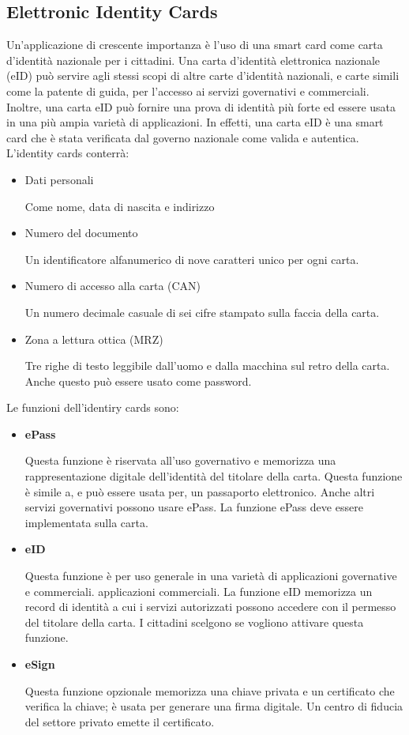 \subsection{Elettronic Identity Cards}
Un'applicazione di crescente importanza è l'uso di una smart card come carta d'identità nazionale per i cittadini. Una carta d'identità elettronica nazionale (eID) può servire agli stessi scopi di altre carte d'identità nazionali, e carte simili come la patente di guida, per l'accesso ai servizi governativi e commerciali. Inoltre, una carta eID può fornire una prova di identità più forte ed essere usata in una più ampia varietà di applicazioni. In effetti, una carta eID è una smart card che è stata verificata dal governo nazionale come valida e autentica.
\singlespacing
L'identity cards conterrà:
\begin{itemize}
    \item Dati personali 
    
    Come nome, data di nascita e indirizzo
    
    \item Numero del documento
    
    Un identificatore alfanumerico di nove caratteri unico per ogni carta.

    \item Numero di accesso alla carta (CAN)
    
    Un numero decimale casuale di sei cifre stampato sulla faccia della carta.
    
    \item Zona a lettura ottica (MRZ)
    
     Tre righe di testo leggibile dall'uomo e dalla macchina sul retro della carta. Anche questo può essere usato come password.
\end{itemize}
Le funzioni dell'identiry cards sono:
\begin{itemize}
    \item \textbf{ePass}
    
    Questa funzione è riservata all'uso governativo e memorizza una rappresentazione digitale dell'identità del titolare della carta. Questa funzione è simile a, e può essere usata per, un passaporto elettronico. Anche altri servizi governativi possono usare ePass. La funzione ePass deve essere implementata sulla carta.
    
    \item \textbf{eID}
    
    Questa funzione è per uso generale in una varietà di applicazioni governative e commerciali. applicazioni commerciali. La funzione eID memorizza un record di identità a cui i servizi autorizzati possono accedere con il permesso del titolare della carta. I cittadini scelgono se vogliono attivare questa funzione.
    
    \item \textbf{eSign}
    
    Questa funzione opzionale memorizza una chiave privata e un certificato che verifica la chiave; è usata per generare una firma digitale. Un centro di fiducia del settore privato emette il certificato.
\end{itemize}
